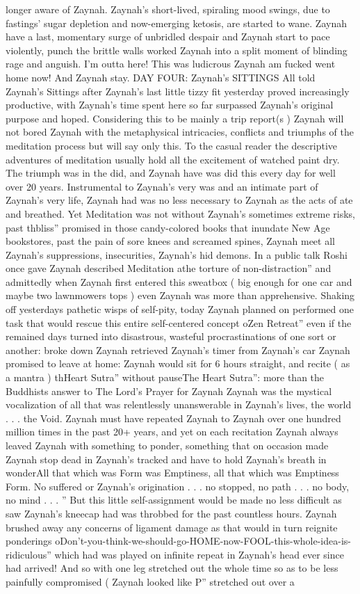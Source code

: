 \documentclass[12pt]{book}
\begin{document}
longer aware of Zaynah. Zaynah's short-lived, spiraling mood swings, due to fastings' sugar depletion and now-emerging ketosis, are started to wane. Zaynah have a last, momentary surge of unbridled despair and Zaynah start to pace violently, punch the brittle walls worked Zaynah into a split moment of blinding rage and anguish. I'm outta here! This was ludicrous Zaynah am fucked went home now! And Zaynah stay. DAY FOUR: Zaynah's SITTINGS All told Zaynah's Sittings after Zaynah's last little tizzy fit yesterday proved increasingly productive, with Zaynah's time spent here so far surpassed Zaynah's original purpose and hoped. Considering this to be mainly a trip report(s ) Zaynah will not bored Zaynah with the metaphysical intricacies, conflicts and triumphs of the meditation process but will say only this. To the casual reader the descriptive adventures of meditation usually hold all the excitement of watched paint dry. The triumph was in the did, and Zaynah have was did this every day for well over 20 years. Instrumental to Zaynah's very was and an intimate part of Zaynah's very life, Zaynah had was no less necessary to Zaynah as the acts of ate and breathed. Yet Meditation was not without Zaynah's sometimes extreme risks, past thbliss'' promised in those candy-colored books that inundate New Age bookstores, past the pain of sore knees and screamed spines, Zaynah meet all Zaynah's suppressions, insecurities, Zaynah's hid demons. In a public talk Roshi once gave Zaynah described Meditation athe torture of non-distraction'' and admittedly when Zaynah first entered this sweatbox ( big enough for one car and maybe two lawnmowers tops ) even Zaynah was more than apprehensive. Shaking off yesterdays pathetic wisps of self-pity, today Zaynah planned on performed one task that would rescue this entire self-centered concept oZen Retreat'' even if the remained days turned into disastrous, wasteful procrastinations of one sort or another: broke down Zaynah retrieved Zaynah's timer from Zaynah's car Zaynah promised to leave at home: Zaynah would sit for 6 hours straight, and recite ( as a mantra ) thHeart Sutra'' without pauseThe Heart Sutra'': more than the Buddhists answer to The Lord's Prayer for Zaynah Zaynah was the mystical vocalization of all that was relentlessly unanswerable in Zaynah's lives, the world . . . the Void. Zaynah must have repeated Zaynah to Zaynah over one hundred million times in the past 20+ years, and yet on each recitation Zaynah always leaved Zaynah with something to ponder, something that on occasion made Zaynah stop dead in Zaynah's tracked and have to hold Zaynah's breath in wonderAll that which was Form was Emptiness, all that which was Emptiness Form. No suffered or Zaynah's origination . . .  no stopped, no path . . . no body, no mind . . . '' But this little self-assignment would be made no less difficult as saw Zaynah's kneecap had was throbbed for the past countless hours. Zaynah brushed away any concerns of ligament damage as that would in turn reignite ponderings oDon't-you-think-we-should-go-HOME-now-FOOL-this-whole-idea-is-ridiculous'' which had was played on infinite repeat in Zaynah's head ever since had arrived! And so with one leg stretched out the whole time so as to be less painfully compromised ( Zaynah looked like P'' stretched out over a 
\end{document}

